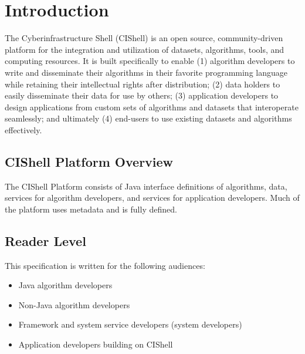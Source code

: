 \chapter{Introduction}

The Cyberinfrastructure Shell (CIShell) is an open source, community-driven
platform for the integration and utilization of datasets, algorithms, tools, and
computing resources. It is built specifically to enable (1) algorithm developers
to write and disseminate their algorithms in their favorite programming language
while retaining their intellectual rights after distribution; (2) data holders to
easily disseminate their data for use by others; (3) application developers to
design applications from custom sets of algorithms and datasets that interoperate
seamlessly; and ultimately (4) end-users to use existing datasets and algorithms
effectively.

\section{CIShell Platform Overview}

The CIShell Platform consists of Java interface definitions of algorithms, data,
services for algorithm developers, and services for application developers. Much
of the platform uses metadata and is fully defined.



\section{Reader Level}

This specification is written for the following audiences:
\begin{itemize}
  \item Java algorithm developers
  \item Non-Java algorithm developers
  \item Framework and system service developers (system developers)
  \item Application developers building on CIShell
\end{itemize}

